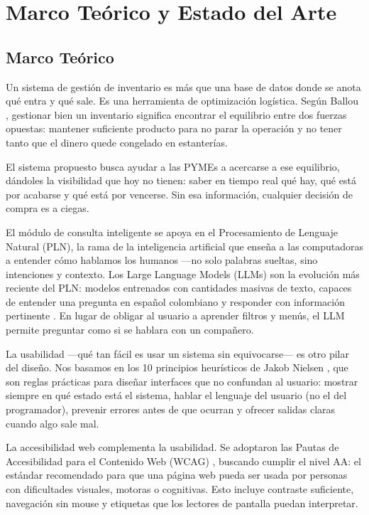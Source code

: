 
\section{Marco Teórico y Estado del Arte}

\subsection{Marco Teórico}

Un sistema de gestión de inventario es más que una base de datos donde se anota qué entra y qué sale. Es una herramienta de optimización logística. Según Ballou \cite{ballou2004logistica}, gestionar bien un inventario significa encontrar el equilibrio entre dos fuerzas opuestas: mantener suficiente producto para no parar la operación y no tener tanto que el dinero quede congelado en estanterías.

El sistema propuesto busca ayudar a las PYMEs a acercarse a ese equilibrio, dándoles la visibilidad que hoy no tienen: saber en tiempo real qué hay, qué está por acabarse y qué está por vencerse. Sin esa información, cualquier decisión de compra es a ciegas.

El módulo de consulta inteligente se apoya en el Procesamiento de Lenguaje Natural (PLN), la rama de la inteligencia artificial que enseña a las computadoras a entender cómo hablamos los humanos ---no solo palabras sueltas, sino intenciones y contexto. Los Large Language Models (LLMs) son la evolución más reciente del PLN: modelos entrenados con cantidades masivas de texto, capaces de entender una pregunta en español colombiano y responder con información pertinente \cite{zhao2023surveyllm}. En lugar de obligar al usuario a aprender filtros y menús, el LLM permite preguntar como si se hablara con un compañero.

La usabilidad ---qué tan fácil es usar un sistema sin equivocarse--- es otro pilar del diseño. Nos basamos en los 10 principios heurísticos de Jakob Nielsen \cite{nielsen1994heuristics}, que son reglas prácticas para diseñar interfaces que no confundan al usuario: mostrar siempre en qué estado está el sistema, hablar el lenguaje del usuario (no el del programador), prevenir errores antes de que ocurran y ofrecer salidas claras cuando algo sale mal.

La accesibilidad web complementa la usabilidad. Se adoptaron las Pautas de Accesibilidad para el Contenido Web (WCAG) \cite{w3c_wcag_overview}, buscando cumplir el nivel AA: el estándar recomendado para que una página web pueda ser usada por personas con dificultades visuales, motoras o cognitivas. Esto incluye contraste suficiente, navegación sin mouse y etiquetas que los lectores de pantalla puedan interpretar.

